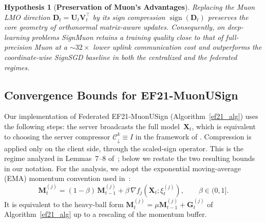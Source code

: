 \documentclass[letterpaper]{article} %
\newtheorem{hypothesis}{Hypothesis}
\begin{document}
\begin{hypothesis}[\textbf{Preservation of Muon's Advantages}]\label{hyp:2}
Replacing the Muon LMO direction $\mathbf{D}_t = \mathbf{U}_t \mathbf{V}_t^\top$ by its sign compression $\operatorname{sign}(\mathbf{D}_t)$ preserves the core geometry of orthonormal matrix-aware updates. Consequently, on deep-learning problems SignMuon retains a training quality close to that of full-precision Muon at a $\sim32\times$ lower uplink communication cost and outperforms the coordinate-wise SignSGD baseline in both the centralized and the federated regimes. 
\end{hypothesis}

\subsection{Convergence Bounds for EF21-MuonUSign}\label{app:ef_bounds}

Our implementation of Federated EF21-MuonUSign (Algorithm~\ref{ef21_alg}) uses the following steps: the server broadcasts the full model~$\mathbf{X}_t$, which is equivalent to choosing the server compressor $\mathcal{C}_{\downarrow}^k \equiv I$ in the framework of \cite{gruntkowska2025error}. Compression is applied only on the client side, through the scaled-sign operator. This is the regime analyzed in Lemmas~7--8 of~\cite{gruntkowska2025error}; below we restate the two resulting bounds in our notation. For the analysis, we adopt the exponential moving-average (EMA) momentum convention used in~\cite{gruntkowska2025error}:
\[
\mathbf{M}_t^{(j)} = (1-\beta)\,\mathbf{M}_{t-1}^{(j)} + \beta\,\nabla f_j(\mathbf{X}_t;\xi_t^{(j)}), \qquad \beta\in(0,1].
\]
It is equivalent to the heavy-ball form $\mathbf{M}_t^{(j)}=\mu\mathbf{M}_{t-1}^{(j)}+\mathbf{G}_t^{(j)}$ of Algorithm~\ref{ef21_alg} up to a rescaling of the momentum buffer.
\end{document}
